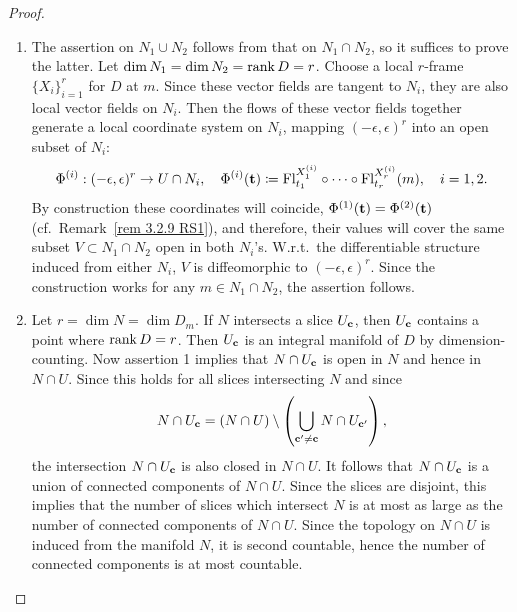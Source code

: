 \begin{proof}
\begin{enumerate}
    \item The assertion on $N_1\cup N_2$ follows from that on $N_1\cap N_2$, so it suffices to prove the latter. Let $\dim N_1=\dim N_2=\rank D=r$. Choose a local $r$-frame $\{X_i\}_{i=1}^r$ for $D$ at $m$. Since these vector fields are tangent to $N_i$, they are also local vector fields on $N_i$. Then the flows of these vector fields together generate a local coordinate system on $N_i$, mapping $(-\epsilon,\epsilon)^r$ into an open subset of $N_i$:
    \[\Phi^{(i)}:(-\epsilon,\epsilon)^r\to U\cap N_i,\quad \Phi^{(i)}(\bf{t})\coloneqq \Fl^{X^{(i)}_1}_{t_1}\circ \cdots\circ \Fl^{X^{(i)}_r}_{t_r}(m),\quad i=1,2.\]
    By construction these coordinates will coincide, $\Phi^{(1)}(\bf{t})=\Phi^{(2)}(\bf{t})$ (cf.\ Remark~\ref{rem 3.2.9 RS1}), and therefore, their values will cover the same subset $V\subset N_1\cap N_2$ open in both $N_i$'s. W.r.t.~the differentiable structure induced from either $N_i$, $V$ is diffeomorphic to $(-\epsilon,\epsilon)^r$. Since the construction works for any $m\in N_1\cap N_2$, the assertion follows. 

    \item Let $r=\dim N=\dim D_m$. If $N$ intersects a slice $U_{\bf{c}}$, then $U_{\bf{c}}$ contains a point where $\rank D=r$. Then $U_{\bf{c}}$ is an integral manifold of $D$ by dimension-counting. Now assertion 1 implies that $N\cap U_{\bf{c}}$ is open in $N$ and hence in $N\cap U$. Since this holds for all slices intersecting $N$ and since
    \[N\cap U_{\bf{c}}=(N\cap U)\setminus\left(\bigcup_{\bf{c}'\neq \bf{c}}N\cap U_{\bf{c}'}\right),\]
    the intersection $N\cap U_{\bf{c}}$ is also closed in $N\cap U$. It follows that $N\cap U_{\bf{c}}$ is a union of connected components of $N\cap U$. Since the slices are disjoint, this implies that the number of slices which intersect $N$ is at most as large as the number of connected components of $N\cap U$. Since the topology on $N\cap U$ is induced from the manifold $N$, it is second countable, hence the number of connected components is at most countable.
\end{enumerate}
\end{proof}



